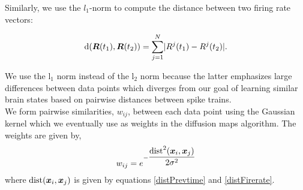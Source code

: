 Similarly, we use the $l_{1}$-norm to compute the distance between two firing rate vectors:

\begin{equation}\label{distFirerate}
\text{d}(\boldsymbol{R}(t_{1}), \boldsymbol{R}(t_{2}) ) = 
\displaystyle \sum_{j=1}^{N} \lvert R^{j}(t_{1}) - R^{j}(t_{2})   \rvert.
\end{equation}

We use the  l$_1$ norm  instead of the l$_{2}$ norm because the latter emphasizes large differences between data points which diverges from our goal of learning similar brain states  based on pairwise distances between spike trains.\\


We form pairwise similarities, $w_{ij}$, between each data point using the Gaussian kernel  which we eventually use as weights in the diffusion maps algorithm. The weights are given by,
\[
w_{ij} = e^{-\dfrac{\text{dist}^{2}(\boldsymbol{x}_{i}, \boldsymbol{x}_{j})}{2\sigma^2}} 
\]   where $\text{dist}(\boldsymbol{x}_{i}, \boldsymbol{x}_{j})$ is given by equations
\eqref{distPrevtime} and \eqref{distFirerate}. 



























